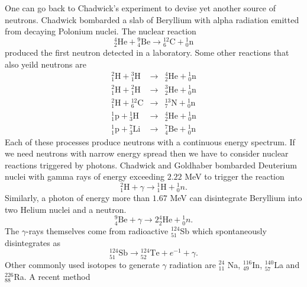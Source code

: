 \documentclass{article}
\numberwithin{equation}{section}
\begin{document}
One can go back to
Chadwick's experiment \cite{chadwick1932existence} to devise yet another source
of neutrons. Chadwick bombarded a slab of Beryllium with alpha radiation 
emitted from decaying Polonium nuclei. The nuclear reaction
\begin{equation}\label{s3e1}
{}_2^4\text{He} + {}_4^9\text{Be} \rightarrow {}_6^{12}\text{C}+{}_0^1\text{n}
\end{equation}
produced the first neutron detected in a laboratory. Some other reactions that 
also yeild neutrons are\cite{turner2008atoms}
\begin{eqnarray}
{}^2_1\text{H} + {}^3_1\text{H}&\rightarrow&{}_2^{4}\text{He}+{}_0^1\text{n}
\label{s3e2} \\
{}^2_1\text{H} + {}^2_1\text{H}&\rightarrow&{}_2^{3}\text{He}+{}_0^1\text{n}
\label{s3e3} \\
{}^2_1\text{H} + {}_6^{12}\text{C}&\rightarrow&{}_7^{13}\text{N}+{}_0^1\text{n}
\label{s3e4} \\
{}^1_1\text{p} + {}_3^1\text{H}&\rightarrow&{}_2^{4}\text{He}+{}_0^1\text{n}
\label{s3e5} \\
{}_1^1\text{p} + {}_3^7\text{Li}&\rightarrow&{}_4^{7}\text{Be}+{}_0^1\text{n}
 \label{s3e6} 
\end{eqnarray}
Each of these processes produce neutrons with a continuous energy spectrum. If
we need neutrons with narrow energy spread then we have to consider nuclear
reactions triggered by photons. Chadwick and Goldhaber 
\cite{chadwick1934nuclear} bombarded Deuterium nuclei with gamma rays of energy
exceeding $2.22$ MeV to trigger the reaction
\begin{equation}\label{s3e7}
{}^2_1\text{H} + \gamma \rightarrow {}^1_1 \text{H} + {}^1_0 n.
\end{equation}
Similarly, a photon of energy more than $1.67$ MeV can disintegrate Beryllium
into two Helium nuclei and a neutron.
\begin{equation}\label{s3e8}
{}^9_4\text{Be} + \gamma \rightarrow 2 {}^4_2\text{He} + {}^1_0 n.
\end{equation}
The $\gamma$-rays themselves come from radioactive ${}^{124}_{51}$Sb which 
spontaneously disintegrates as
\begin{equation}\label{s3e9}
{}^{124}_{51}\text{Sb} \rightarrow {}^{124}_{52}\text{Te} + e^{-1} + \gamma.
\end{equation}
Other commonly used isotopes to generate $\gamma$ radiation are ${}^{24}_{11}$
Na, ${}^{116}_{49}$In, ${}^{140}_{57}$La and ${}^{226}_{88}$Ra. A recent method
\end{document}

